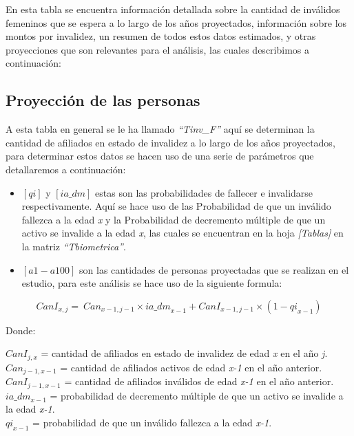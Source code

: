 \documentclass[
  letterpaper,
  DIV=11,
  numbers=noendperiod]{scrreprt}
\begin{document}
En esta tabla se encuentra información detallada sobre la cantidad de
inválidos femeninos que se espera a lo largo de los años proyectados,
información sobre los montos por invalidez, un resumen de todos estos
datos estimados, y otras proyecciones que son relevantes para el
análisis, las cuales describimos a continuación:

\hypertarget{proyecciuxf3n-de-las-personas-3}{%
\subsection{Proyección de las
personas}\label{proyecciuxf3n-de-las-personas-3}}

A esta tabla en general se le ha llamado \emph{``Tinv\_F''} aquí se
determinan la cantidad de afiliados en estado de invalidez a lo largo de
los años proyectados, para determinar estos datos se hacen uso de una
serie de parámetros que detallaremos a continuación:

\begin{itemize}
\item
  \([qi]\) y \([ia\_dm]\) estas son las probabilidades de fallecer e
  invalidarse respectivamente. Aquí se hace uso de las Probabilidad de
  que un inválido fallezca a la edad \emph{x} y la Probabilidad de
  decremento múltiple de que un activo se invalide a la edad \emph{x},
  las cuales se encuentran en la hoja \emph{{[}Tablas{]}} en la matriz
  \emph{``Tbiometrica''}.
\item
  \([a1-a100]\) son las cantidades de personas proyectadas que se
  realizan en el estudio, para este análisis se hace uso de la siguiente
  formula:
\end{itemize}

\begin{equation}
{CanI}_{x,j}=\ {Can}_{x-1,j-1}\times{ia\_dm}_{x-1}+{CanI}_{x-1,j-1}\times\left(1-{qi}_{x-1}\right)
\end{equation}

Donde:

\({CanI}_{j,x}\) = cantidad de afiliados en estado de invalidez de edad
\emph{x} en el año \emph{j}.\\
\({Can}_{j-1,x-1}\) = cantidad de afiliados activos de edad \emph{x-1}
en el año anterior.\\
\({CanI}_{j-1,x-1}\) = cantidad de afiliados inválidos de edad
\emph{x-1} en el año anterior.\\
\({ia\_dm}_{x-1}\) = probabilidad de decremento múltiple de que un
activo se invalide a la edad \emph{x-1}.\\
\({qi}_{x-1}\) = probabilidad de que un inválido fallezca a la edad
\emph{x-1}.
\end{document}
